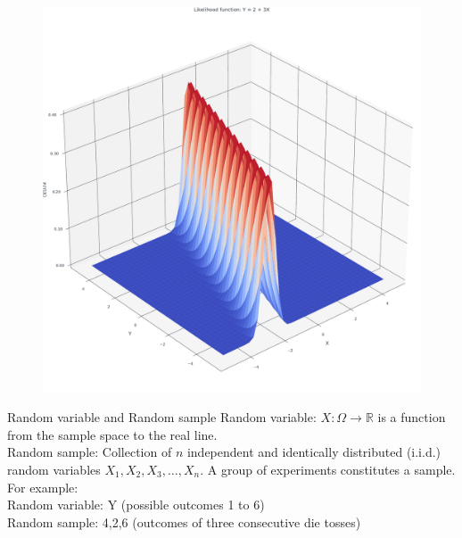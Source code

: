 \documentclass[handout]{beamer}
\begin{document}
\begin{frame}
    \begin{figure}
                \includegraphics[scale=0.35]{../figures/mle/linear_reg.pdf}
    \end{figure}
\end{frame}
    \begin{frame}{Random variable and Random sample}
    Random variable: $X:\Omega\rightarrow\mathbb{R}$ is a function from the sample space to the real line. \\ 
    \addlinespace
    \addlinespace
    Random sample: Collection of $n$ independent and identically distributed (i.i.d.) random variables $X_1, X_2, X_3, \ldots, X_n$. A group of experiments constitutes a sample.\\
    \addlinespace
    \addlinespace
    For example:\\
    Random variable: Y (possible outcomes 1 to 6)\\
    Random sample: {4,2,6} (outcomes of three consecutive die tosses)
    \end{frame}
\end{document}
